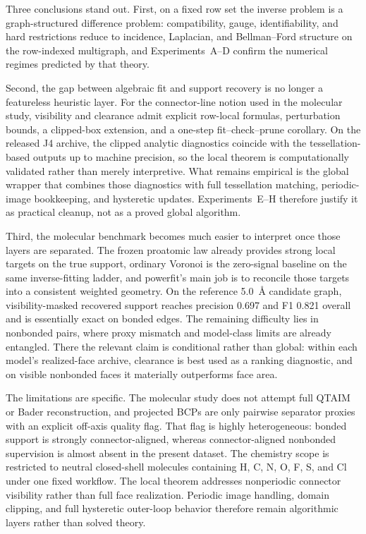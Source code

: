 \documentclass[preprint,12pt]{elsarticle}
\begin{document}
Three conclusions stand out. First, on a fixed row set the inverse problem is
a graph-structured difference problem: compatibility, gauge, identifiability,
and hard restrictions reduce to incidence, Laplacian, and Bellman--Ford
structure on the row-indexed multigraph, and Experiments~A--D confirm the
numerical regimes predicted by that theory.

Second, the gap between algebraic fit and support recovery is no longer a
featureless heuristic layer. For the connector-line notion used in the
molecular study, visibility and clearance admit explicit row-local formulas,
perturbation bounds, a clipped-box extension, and a one-step
fit--check--prune corollary. On the released J4 archive, the clipped analytic
diagnostics coincide with the tessellation-based outputs up to machine
precision, so the local theorem is computationally validated rather than merely
interpretive. What remains empirical is the global wrapper that combines those
diagnostics with full tessellation matching, periodic-image bookkeeping, and
hysteretic updates. Experiments~E--H therefore justify it as practical cleanup,
not as a proved global algorithm.

Third, the molecular benchmark becomes much easier to interpret once those
layers are separated. The frozen proatomic law already provides strong local
targets on the true support, ordinary Voronoi is the zero-signal baseline on
the same inverse-fitting ladder, and powerfit's main job is to reconcile those
targets into a consistent weighted geometry. On the reference 5.0~\AA{}
candidate graph, visibility-masked recovered support reaches precision 0.697
and F1 0.821 overall and is essentially exact on bonded edges. The remaining
difficulty lies in nonbonded pairs, where proxy mismatch and model-class limits
are already entangled. There the relevant claim is conditional rather than
global: within each model's realized-face archive, clearance is best used as a
ranking diagnostic, and on visible nonbonded faces it materially outperforms
face area.

The limitations are specific. The molecular study does not attempt full QTAIM
or Bader reconstruction, and projected BCPs are only pairwise separator proxies
with an explicit off-axis quality flag. That flag is highly heterogeneous:
bonded support is strongly connector-aligned, whereas connector-aligned
nonbonded supervision is almost absent in the present dataset. The chemistry
scope is restricted to neutral closed-shell molecules containing H, C, N, O,
F, S, and Cl under one fixed workflow. The local theorem addresses nonperiodic
connector visibility rather than full face realization. Periodic image
handling, domain clipping, and full hysteretic outer-loop behavior therefore
remain algorithmic layers rather than solved theory.
\end{document}
